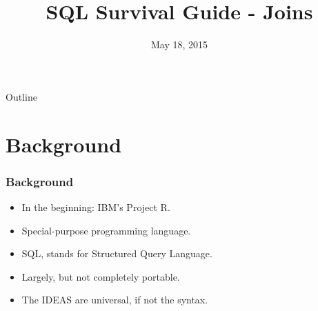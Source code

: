 \documentclass{beamer}
\title[SQL Survival Guide - Joins]{SQL Survival Guide - Joins}
\institute{Office of Quality and Patient Safety}
\date{May 18, 2015}
\begin{document}
\begin{frame}
  \titlepage
\end{frame}

\begin{frame}{Outline}
  \tableofcontents
\end{frame}

\section{Background} %

\begin{frame}
  \frametitle{Background}
  \begin{itemize}
  \item In the beginning: IBM's Project R.
  \item Special-purpose programming language.
  \item SQL, stands for Structured Query Language.
  \item Largely, but not completely portable.
  \item The IDEAS are universal, if not the syntax.
  \end{itemize}
\end{frame}  
\end{document}

